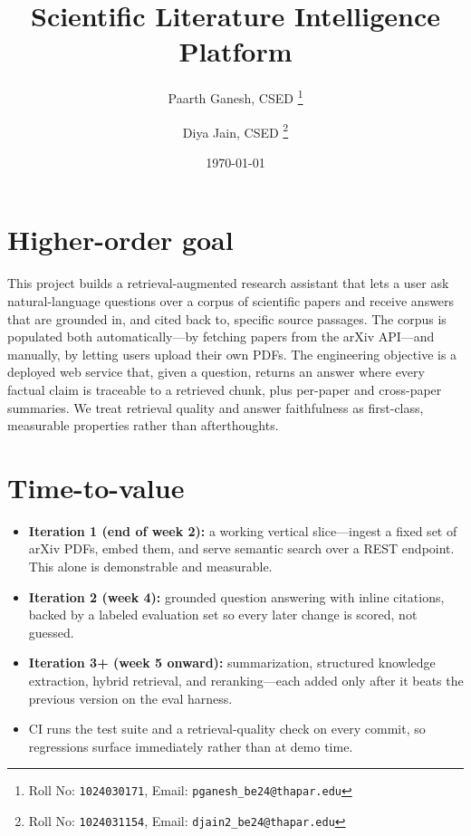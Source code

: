\documentclass[11pt,a4paper]{article}
\title{Scientific Literature Intelligence Platform}
\author{
  Paarth Ganesh, CSED%
  \thanks{Roll No: \texttt{1024030171}, %
    Email: \texttt{pganesh\_be24@thapar.edu}}
  \and
  Diya Jain, CSED%
  \thanks{Roll No: \texttt{1024031154}, %
    Email: \texttt{djain2\_be24@thapar.edu}}
}
\date{\today}
\begin{document}
\maketitle

\section{Higher-order goal}
This project builds a retrieval-augmented research assistant
that lets a user ask natural-language questions over a corpus
of scientific papers and receive answers that are grounded in,
and cited back to, specific source passages. The corpus is
populated both automatically---by fetching papers from the
arXiv API---and manually, by letting users upload their own
PDFs. The engineering objective is a deployed web service that,
given a question, returns an answer where every factual claim
is traceable to a retrieved chunk, plus per-paper and
cross-paper summaries. We treat retrieval quality and answer
faithfulness as first-class, measurable properties rather than
afterthoughts.

\section{Time-to-value}
\begin{itemize}[leftmargin=0.7cm]
    \item \textbf{Iteration 1 (end of week 2):} a working vertical slice---ingest a fixed set of arXiv PDFs, embed them, and serve semantic search over a REST endpoint. This alone is demonstrable and measurable.
    \item \textbf{Iteration 2 (week 4):} grounded question answering with inline citations, backed by a labeled evaluation set so every later change is scored, not guessed.
    \item \textbf{Iteration 3+ (week 5 onward):} summarization, structured knowledge extraction, hybrid retrieval, and reranking---each added only after it beats the previous version on the eval harness.
    \item CI runs the test suite and a retrieval-quality check on every commit, so regressions surface immediately rather than at demo time.
\end{itemize}
\end{document}
